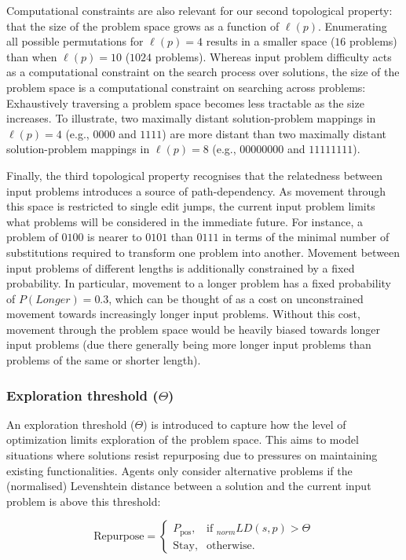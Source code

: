 \documentclass{article}
\begin{document}
Computational constraints are also relevant for our second topological property: that the size of the problem space grows as a function of $\ell(p)$. Enumerating all possible permutations for $\ell(p)=4$ results in a smaller space ($16$ problems) than when $\ell(p)=10$ ($1024$ problems). Whereas input problem difficulty acts as a computational constraint on the search process over solutions, the size of the problem space is a computational constraint on searching across problems: Exhaustively traversing a problem space becomes less tractable as the size increases. To illustrate, two maximally distant solution-problem mappings in $\ell(p)=4$ (e.g., $0000$ and $1111$) are more distant than two maximally distant solution-problem mappings in $\ell(p)=8$ (e.g., $00000000$ and $11111111$).

Finally, the third topological property recognises that the relatedness between input problems introduces a source of path-dependency. As movement through this space is restricted to single edit jumps, the current input problem limits what problems will be considered in the immediate future. For instance, a problem of $0100$ is nearer to $0101$ than $0111$ in terms of the minimal number of substitutions required to transform one problem into another. Movement between input problems of different lengths is additionally constrained by a fixed probability. In particular, movement to a longer problem has a fixed probability of $P(Longer)=0.3$, which can be thought of as a cost on unconstrained movement towards increasingly longer input problems. Without this cost, movement through the problem space would be heavily biased towards longer input problems (due there generally being more longer input problems than problems of the same or shorter length).

\subsubsection{Exploration threshold ($\Theta$)}
An exploration threshold ($\Theta$) is introduced to capture how the level of optimization limits exploration of the problem space. This aims to model situations where solutions resist repurposing due to pressures on maintaining existing functionalities. Agents only consider alternative problems if the (normalised) Levenshtein distance between a solution and the current input problem is above this threshold:

\begin{equation}
\text{Repurpose} =
\begin{cases}
    P_{\text{pos}}, & \text{if $_{norm}LD(s,p) > \Theta$}\\
    \text{Stay}, & \text{otherwise.}
\end{cases}
\end{equation}  
\end{document}
